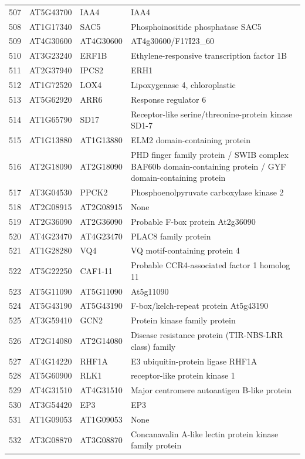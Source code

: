 \documentclass[11pt]{article}
\begin{document}
\begin{center}
\begin{tabular}{rlll}
507 & AT5G43700 & IAA4 & IAA4\\
508 & AT1G17340 & SAC5 & Phosphoinositide phosphatase SAC5\\
509 & AT4G30600 & AT4G30600 & AT4g30600/F17I23\_60\\
510 & AT3G23240 & ERF1B & Ethylene-responsive transcription factor 1B\\
511 & AT2G37940 & IPCS2 & ERH1\\
512 & AT1G72520 & LOX4 & Lipoxygenase 4, chloroplastic\\
513 & AT5G62920 & ARR6 & Response regulator 6\\
514 & AT1G65790 & SD17 & Receptor-like serine/threonine-protein kinase SD1-7\\
515 & AT1G13880 & AT1G13880 & ELM2 domain-containing protein\\
516 & AT2G18090 & AT2G18090 & PHD finger family protein / SWIB complex BAF60b domain-containing protein / GYF domain-containing protein\\
517 & AT3G04530 & PPCK2 & Phosphoenolpyruvate carboxylase kinase 2\\
518 & AT2G08915 & AT2G08915 & None\\
519 & AT2G36090 & AT2G36090 & Probable F-box protein At2g36090\\
520 & AT4G23470 & AT4G23470 & PLAC8 family protein\\
521 & AT1G28280 & VQ4 & VQ motif-containing protein 4\\
522 & AT5G22250 & CAF1-11 & Probable CCR4-associated factor 1 homolog 11\\
523 & AT5G11090 & AT5G11090 & At5g11090\\
524 & AT5G43190 & AT5G43190 & F-box/kelch-repeat protein At5g43190\\
525 & AT3G59410 & GCN2 & Protein kinase family protein\\
526 & AT2G14080 & AT2G14080 & Disease resistance protein (TIR-NBS-LRR class) family\\
527 & AT4G14220 & RHF1A & E3 ubiquitin-protein ligase RHF1A\\
528 & AT5G60900 & RLK1 & receptor-like protein kinase 1\\
529 & AT4G31510 & AT4G31510 & Major centromere autoantigen B-like protein\\
530 & AT3G54420 & EP3 & EP3\\
531 & AT1G09053 & AT1G09053 & None\\
532 & AT3G08870 & AT3G08870 & Concanavalin A-like lectin protein kinase family protein\\

\end{tabular}
\end{center}
\end{document}
